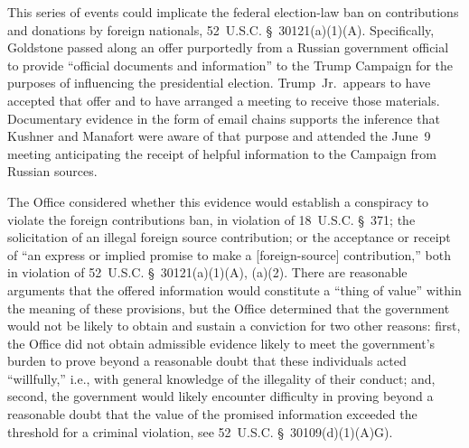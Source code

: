This series of events could implicate the federal election-law ban on contributions and donations by foreign nationals, 52~U.S.C. \S~30121(a)(1)(A).
Specifically, Goldstone passed along an offer purportedly from a Russian government official to provide ``official documents and information'' to the Trump Campaign for the purposes of influencing the presidential election.
Trump~Jr.\ appears to have accepted that offer and to have arranged a meeting to receive those materials.
Documentary evidence in the form of email chains supports the inference that Kushner and Manafort were aware of that purpose and attended the June~9 meeting anticipating the receipt of helpful information to the Campaign from Russian sources.

The Office considered whether this evidence would establish a conspiracy to violate the foreign contributions ban, in violation of 18~U.S.C. \S~371; the solicitation of an illegal foreign source contribution; or the acceptance or receipt of ``an express or implied promise to make a [foreign-source] contribution,'' both in violation of 52~U.S.C. \S~30121(a)(1)(A), (a)(2).
There are reasonable arguments that the offered information would constitute a ``thing of value'' within the meaning of these provisions, but the Office determined that the government would not be likely to obtain and sustain a conviction for two other reasons: first, the Office did not obtain admissible evidence likely to meet the government's burden to prove beyond a reasonable doubt that these individuals acted ``willfully,'' i.e., with general knowledge of the illegality of their conduct; and, second, the government would likely encounter difficulty in proving beyond a reasonable doubt that the value of the promised information exceeded the threshold for a criminal violation, see 52~U.S.C. \S~30109(d)(1)(A)G).

